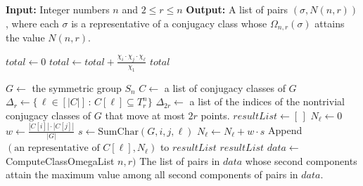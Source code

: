 \documentclass{amsart}
\newcommand{\Input}{\State \textbf{Input:} }
\newcommand{\Output}{\State \textbf{Output:} }
\numberwithin{equation}{section}
\begin{document}
\begin{algorithm}[H]
\caption{Compute \(N(n, r)\) as obtained from Equation (\ref{formul})}
\begin{algorithmic}[1]
\Input Integer numbers  \(n \) and  \(2\leq r \leq n\)
\Output A list of pairs $(\sigma, N(n,r))$, where each $\sigma$ is a representative of a conjugacy class whose $\Omega_{n,r}(\sigma)$ attains the value $N(n,r)$.

  \State \(total \gets 0\)
    \State \(total \gets total + \frac{\chi_i \cdot \chi_j \cdot \chi_\ell}{\chi_1}\)
  \EndFor
  \State \Return \(total\)
\EndFunction

  \State \(G \gets \) the symmetric group \(S_n\)
  \State \(C \gets\) a list of conjugacy classes of $G$
 \State \(\Delta_{r} \gets \{\,\ell \in [|C|]\, :\, C[\ell]\subseteq T_{r}^n\}\)
  \hfill\Comment{\textcolor{blue}{Indices of classes moving at most $r$ points}}
\State \(\Delta_{2r} \gets\)  a list of  the indices of the nontrivial conjugacy classes of $G$ that move at most $2r$ points.
  \State \(resultList \gets [\,]\) \hfill{}
    \State \(N_\ell \gets 0\) 
        \State \(w \gets \frac{|C[i]| \cdot |C[j]|}{|G|}\)
        \State \(s \gets \mathrm{SumChar}(G, i, j, \ell)\)
        \State \(N_\ell \gets N_\ell + w \cdot s\)
      \EndFor
    \EndFor
    \State Append \((\text{an representative of}\,\, C[\ell], N_\ell)\) to \(resultList\)
  \EndFor
  \State \Return \(resultList\)
\EndFunction
{}
   \State \(data \gets \) ComputeClassOmegaList \(n,r)\)
  \State \Return The list of pairs in $data$ whose second components attain the maximum value among all second components of pairs in $data$.
\EndFunction
\end{algorithmic}
\end{algorithm}
\end{document}
